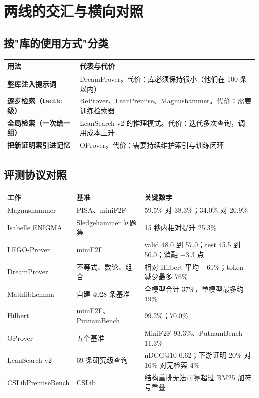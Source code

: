 \documentclass[UTF8,a4paper,11pt,fontset=windows]{ctexart}
\begin{document}
\section{两线的交汇与横向对照}

\subsection{按"库的使用方式"分类}

\begin{table}[htbp]
\centering
\small
\begin{tabularx}{\textwidth}{@{}p{4.6cm}Y@{}}
\toprule
\textbf{用法} & \textbf{代表与代价} \\
\midrule
\textbf{整库注入提示词} & DreamProver。代价：库必须保持很小（他们在 100 条以内） \\
\midrule
\textbf{逐步检索（tactic 级）} & ReProver、LeanPremise、Magnushammer。代价：需要训练检索器 \\
\midrule
\textbf{全局检索（一次给一组）} & LeanSearch v2 的推理模式。代价：迭代多次查询，调用成本上升 \\
\midrule
\textbf{把新证明索引进记忆} & OProver。代价：需要持续维护索引与训练闭环 \\
\bottomrule
\end{tabularx}
\end{table}

\subsection{评测协议对照}

\begin{table}[htbp]
\centering
\footnotesize
\begin{tabularx}{\textwidth}{@{}p{3.6cm}p{4.0cm}Y@{}}
\toprule
\textbf{工作} & \textbf{基准} & \textbf{关键数字} \\
\midrule
Magnushammer & PISA、miniF2F & 59.5\% 对 38.3\%；34.0\% 对 20.9\% \\
\midrule
Isabelle ENIGMA & Sledgehammer 问题集 & 15 秒内相对提升 25.3\% \\
\midrule
LEGO-Prover & miniF2F & valid 48.0 到 57.0；test 45.5 到 50.0；消融 +3.3 点 \\
\midrule
DreamProver & 不等式、数论、组合 & 相对 Hilbert 平均 +61\%；token 减少最多 76\% \\
\midrule
MathlibLemma & 自建 4028 条基准 & 全模型合计 37\%，单模型最多约 19\% \\
\midrule
Hilbert & miniF2F、PutnamBench & 99.2\%；70.0\% \\
\midrule
OProver & 五个基准 & MiniF2F 93.3\%、PutnamBench 11.3\% \\
\midrule
LeanSearch v2 & 69 条研究级查询 & nDCG@10 0.62；下游证明 20\% 对 16\% 对无检索 4\% \\
\midrule
CSLibPremiseBench & CSLib & 结构重排无法可靠超过 BM25 加符号重叠 \\
\bottomrule
\end{tabularx}
\end{table}
\end{document}
